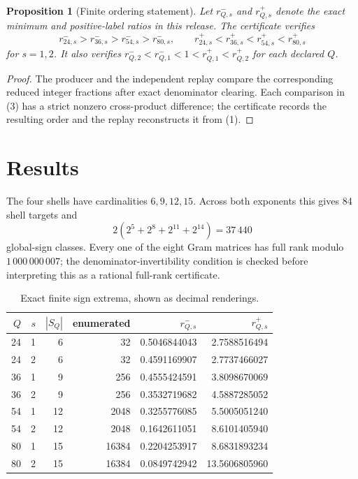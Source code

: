 \documentclass[10pt,a4paper]{article}
\newtheorem{proposition}{Proposition}
\begin{document}
\begin{proposition}[Finite ordering statement]
Let $r^-_{Q,s}$ and $r^+_{Q,s}$ denote the exact minimum and positive-label
ratios in this release.  The certificate verifies
\[
 r^-_{24,s}>r^-_{36,s}>r^-_{54,s}>r^-_{80,s},\qquad
 r^+_{24,s}<r^+_{36,s}<r^+_{54,s}<r^+_{80,s}
 \tag{3}
\]
for $s=1,2$.  It also verifies
$r^-_{Q,2}<r^-_{Q,1}<1<r^+_{Q,1}<r^+_{Q,2}$ for each declared $Q$.
\end{proposition}
\begin{proof}
The producer and the independent replay compare the corresponding reduced
integer fractions after exact denominator clearing.  Each comparison in (3)
has a strict nonzero cross-product difference; the certificate records the
resulting order and the replay reconstructs it from (1).
\end{proof}

\section{Results}

The four shells have cardinalities $6,9,12,15$.  Across both exponents this
gives 84 shell targets and
\[
 2(2^{5}+2^{8}+2^{11}+2^{14})=37\,440
\]
global-sign classes.  Every one of the eight Gram matrices has full rank
modulo $1\,000\,000\,007$; the denominator-invertibility condition is checked
before interpreting this as a rational full-rank certificate.

\begin{table}[t]
\centering\small
\caption{Exact finite sign extrema, shown as decimal renderings.}
\label{tab:rows}
\begin{tabular}{rrrrrr}
\toprule
$Q$ & $s$ & $|S_Q|$ & enumerated & $r^-_{Q,s}$ & $r^+_{Q,s}$\\
\midrule
24 & 1 & 6  & 32    & 0.5046844043 & 2.7588516494\\
24 & 2 & 6  & 32    & 0.4591169907 & 2.7737466027\\
36 & 1 & 9  & 256   & 0.4555424591 & 3.8098670069\\
36 & 2 & 9  & 256   & 0.3532719682 & 4.5887285052\\
54 & 1 & 12 & 2048  & 0.3255776085 & 5.5005051240\\
54 & 2 & 12 & 2048  & 0.1642611051 & 8.6101405940\\
80 & 1 & 15 & 16384 & 0.2204253917 & 8.6831893234\\
80 & 2 & 15 & 16384 & 0.0849742942 & 13.5606805960\\
\bottomrule
\end{tabular}
\end{table}
\end{document}
